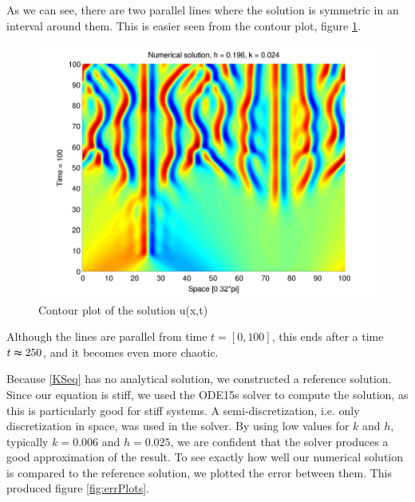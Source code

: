 As we can see, there are two parallel lines where the solution is symmetric in an interval around them. This is easier seen from the contour plot, figure \ref{fig:contour}.

\begin{figure}[H]
\centering
\includegraphics[scale=0.55]
{PDFs/IMEX/KS_plot_contour.pdf}
\caption{Contour plot of the solution u(x,t)}
\label{fig:contour}
\end{figure}

Although the lines are parallel from time $t = [0,100]$, this ends after a time $t \thickapprox 250$, and it becomes even more chaotic.

Because \eqref{KSeq} has no analytical solution, we constructed a reference solution. Since our equation is stiff, we used the ODE15s solver to compute the solution, as this is particularly good for stiff systems. A semi-discretization, i.e. only discretization in space, was used in the solver. By using low values for $k$ and $h$, typically $k = 0.006$ and $h = 0.025$, we are confident that the solver produces a good approximation of the result. To see exactly how well our numerical solution is compared to the reference solution, we plotted the error between them. This produced figure \ref{fig:errPlots}.

